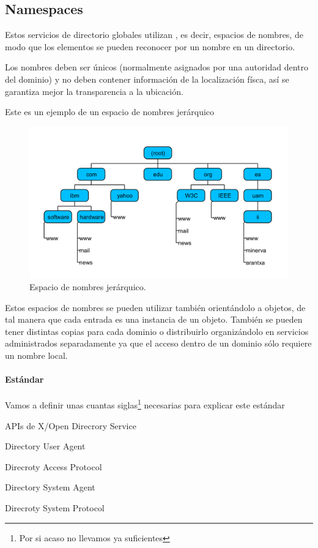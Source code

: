 \subsection{Namespaces}
Estos servicios de directorio globales utilizan , es decir, espacios de nombres, de modo que los elementos se pueden reconocer por un nombre en un directorio.

Los nombres deben ser únicos (normalmente asignados por una autoridad dentro del dominio) y no deben contener información de la localización físca, así se garantiza mejor la transparencia a la ubicación.

Este es un ejemplo de un espacio de nombres jerárquico


\begin{figure}[hbtp]
\centering
\includegraphics[width=1\textwidth]{img/namespaces.png}
\caption{Espacio de nombres jerárquico.}
\label{namespaces}
\end{figure}

Estos espacios de nombres se pueden utilizar también orientándolo a objetos, de tal manera que cada entrada es una instancia de un objeto. También se pueden tener distintas copias para cada dominio o distribuirlo organizándolo en servicios administrados separadamente ya que el acceso dentro de un dominio sólo requiere un nombre local.

\paragraph{Estándar }
Vamos a definir unas cuantas siglas\footnote{Por si acaso no llevamos ya suficientes} necesarias para explicar este estándar
\begin{defn}[XDS]
	APIs de X/Open Direcrory Service
\end{defn}
\begin{defn}[DUA]
	Directory User Agent
\end{defn}
\begin{defn}[DAP]
	Direcroty Access Protocol
\end{defn}
\begin{defn}[DSA]
	Directory System Agent
\end{defn}
\begin{defn}[DSP]
	Direcroty System Protocol
\end{defn}

